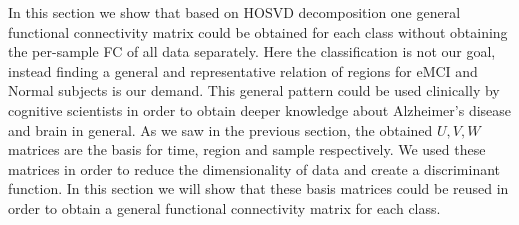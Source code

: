 \documentclass[preprint,12pt]{elsarticle}
\begin{document}
In this section we show that based on HOSVD decomposition one general functional connectivity matrix could be obtained for each class without obtaining the per-sample FC of all data separately. Here the classification is not our goal, instead  finding a general and representative
	relation of regions for eMCI and Normal subjects is our demand. This general pattern could be used clinically by  cognitive scientists in order to obtain deeper knowledge about Alzheimer's disease and brain in general.
%
As we saw in the previous section, the obtained $U,V,W$ matrices are the basis for time, region and sample respectively. We used these matrices in order to reduce the dimensionality of data and create a discriminant function. In this section we will show that these basis matrices could be reused in order to obtain a general functional connectivity matrix for each class.  
\end{document}
